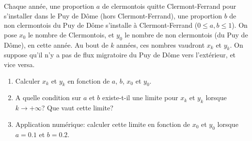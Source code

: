 \begin{exo}\rm
 Chaque année, une proportion $a$ de clermontois quitte Clermont-Ferrand pour s'installer 
dans le Puy de Dôme (hors Clermont-Ferrand), une proportion $b$ de non clermontois
du Puy de Dôme s'installe à Clermont-Ferrand ($0\le a,b\le 1$). On pose $x_0$ le nombre
de Clermontois, et $y_0$ le nombre de non clermontois (du Puy de Dôme), en cette année.
 Au bout de $k$ années, ces nombres vaudront $x_k$ et $y_k$. On suppose qu'il n'y a pas
de flux migratoire du Puy de Dôme vers l'extérieur, et vice versa.

\begin{enumerate}
 \item Calculer $x_k$ et $y_k$ en fonction de $a$, $b$, $x_0$ et $y_0$.
\item  A quelle condition sur $a$ et $b$ existe-t-il une limite pour $x_k$ et
$y_k$ lorsque $k\rightarrow+\infty$? Que vaut cette limite?
\item Application numérique: calculer cette limite en fonction de $x_0$ et $y_0$ lorsque
$a=0.1$ et $b=0.2$.
\end{enumerate}
\end{exo}





